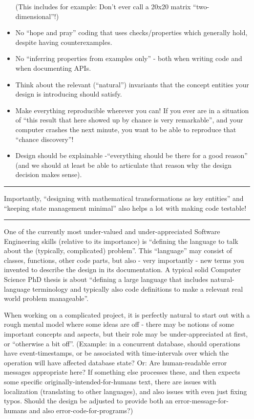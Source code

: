 \documentclass[11pt]{article}
\begin{document}
\begin{itemize}
  (This includes for example: Don't ever call a 20x20 matrix
  ``two-dimensional''!)
\item
  No ``hope and pray'' coding that uses checks/properties which
  generally hold, despite having counterexamples.
\item
  No ``inferring properties from examples only'' - both when writing
  code and when documenting APIs.
\item
  Think about the relevant (``natural'') invariants that the concept
  entities your design is introducing should satisfy.
\item
  Make everything reproducible wherever you can! If you ever are in a
  situation of ``this result that here showed up by chance is very
  remarkable'', and your computer crashes the next minute, you want to
  be able to reproduce that ``chance discovery''!
\item
  Design should be explainable -``everything should be there for a good
  reason'' (and we should at least be able to articulate that reason why
  the design decision makes sense).
\end{itemize}

\begin{center}\rule{0.5\linewidth}{0.5pt}\end{center}

Importantly, ``designing with mathematical transformations as key
entities'' and ``keeping state management minimal'' also helps a lot
with making code testable!

\begin{center}\rule{0.5\linewidth}{0.5pt}\end{center}

One of the currently most under-valued and under-appreciated Software
Engineering skills (relative to its importance) is ``defining the
language to talk about the (typically, complicated) problem''. This
``language'' may consist of classes, functions, other code parts, but
also - very importantly - new terms you invented to describe the design
in its documentation. A typical solid Computer Science PhD thesis is
about ``defining a large language that includes natural-language
terminology and typically also code definitions to make a relevant real
world problem manageable''.

When working on a complicated project, it is perfectly natural to start
out with a rough mental model where some ideas are off - there may be
notions of some important concepts and aspects, but their role may be
under-appreciated at first, or ``otherwise a bit off''. (Example: in a
concurrent database, should operations have event-timestamps, or be
associated with time-intervals over which the operation will have
affected database state? Or: Are human-readable error messages
appropriate here? If something else processes these, and then expects
some specific originally-intended-for-humans text, there are issues with
localization (translating to other languages), and also issues with even
just fixing typos. Should the design be adjusted to provide both an
error-message-for-humans and also error-code-for-programs?)
\end{document}
